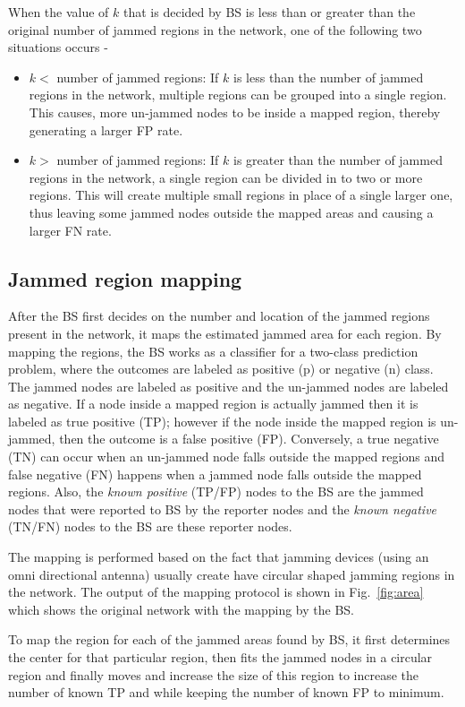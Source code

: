 \documentclass[conference]{IEEEtran}
\begin{document}
When the value of $k$ that is decided by BS is less than or greater than the original number of jammed regions in the network, one of the following two situations occurs - 
\begin{itemize}
\item
$k <$ number of jammed regions: If $k$ is less than the number of jammed regions in the network, multiple regions can be grouped into a single region. This causes, more un-jammed nodes to be inside a mapped region, thereby generating a larger FP rate. \item
$k >$ number of jammed regions: If $k$ is greater than the number of jammed regions in the network, a single region can be divided in to two or more regions. This will create multiple small regions in place of a single larger one, thus leaving some jammed nodes outside the mapped areas and causing a larger FN rate. \end{itemize}

\subsection{Jammed region mapping}

After the BS first decides on the number and location of the jammed regions present in the network, it maps the estimated jammed area for each region. By mapping the regions, the BS works as a classifier for a two-class prediction problem, where the outcomes are labeled as positive (p) or negative (n) class. The jammed nodes are labeled as positive and the un-jammed nodes are labeled as negative. If a node inside a mapped region is actually jammed then it is labeled as true positive (TP); however if the node inside the mapped region is un-jammed, then the outcome is a false positive (FP). Conversely, a true negative (TN) can occur when an un-jammed node falls outside the mapped regions and false negative (FN) happens when a jammed node falls outside the mapped regions. Also, the \emph{known positive} (TP/FP) nodes to the BS are the jammed nodes that were reported to BS by the reporter nodes and the \emph{known negative} (TN/FN) nodes to the BS are these reporter nodes. 

The mapping is performed based on the fact that jamming devices (using an omni directional antenna) usually create have circular shaped jamming regions in the network. The output of the mapping protocol is shown in Fig.~\ref{fig:area} which shows the original network with the mapping by the BS.

To map the region for each of the jammed areas found by BS, it first determines the center for that particular region, then fits the jammed nodes in a circular region and finally moves and increase the size of this region to increase the number of known TP and while keeping the number of known FP to minimum.
\end{document}
